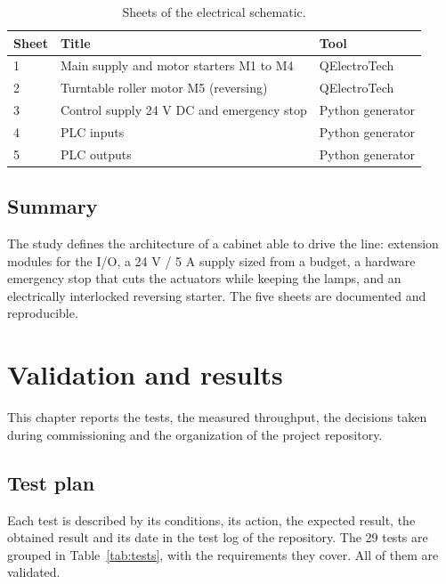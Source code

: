\documentclass[11pt,a4paper]{report}
\begin{document}
\begin{table}[H]
\centering\small
\caption{Sheets of the electrical schematic.}\label{tab:sheets}
\begin{tabularx}{\linewidth}{@{}p{1.2cm}Yp{3.6cm}@{}}
\toprule
\textbf{Sheet} & \textbf{Title} & \textbf{Tool}\\
 & Main supply and motor starters M1 to M4 & QElectroTech\\
2 & Turntable roller motor M5 (reversing) & QElectroTech\\
3 & Control supply 24 V DC and emergency stop & Python generator\\
4 & PLC inputs & Python generator\\
5 & PLC outputs & Python generator\\
\bottomrule
\end{tabularx}
\end{table}

\section{Summary}
The study defines the architecture of a cabinet able to drive the line: extension modules for the I/O, a 24 V / 5 A supply sized from a budget, a hardware emergency stop that cuts the actuators while keeping the lamps, and an electrically interlocked reversing starter. The five sheets are documented and reproducible.

\chapter{Validation and results}\label{ch:tests}
This chapter reports the tests, the measured throughput, the decisions taken during commissioning and the organization of the project repository.

\section{Test plan}
Each test is described by its conditions, its action, the expected result, the obtained result and its date in the test log of the repository. The 29 tests are grouped in Table~\ref{tab:tests}, with the requirements they cover. All of them are validated.
\end{document}

